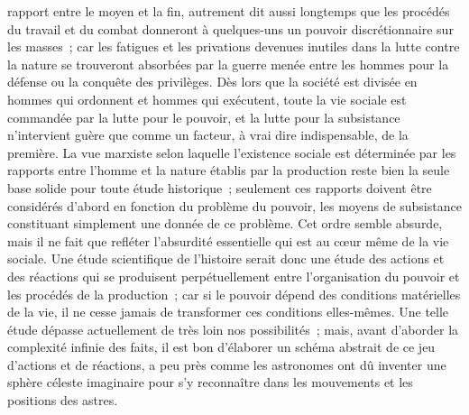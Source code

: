 \documentclass[french,twoside]{book} %
\begin{document}
rapport entre le moyen et la fin, autrement dit aussi longtemps que les procédés du travail et du combat donneront à quelques-uns un pouvoir discrétionnaire sur les masses ; car les fatigues et les privations devenues inutiles dans la lutte contre la nature se trouveront absorbées par la guerre menée entre les hommes pour la défense ou la conquête des privilèges. Dès lors que la société est divisée en hommes qui ordonnent et hommes qui exécutent, toute la vie sociale est commandée par la lutte pour le pouvoir, et la lutte pour la subsistance n'intervient guère que comme un facteur, à vrai dire indispensable, de la première. La vue marxiste selon laquelle l'existence sociale est déterminée par les rapports entre l'homme et la nature établis par la production reste bien la seule base solide pour toute étude historique ; seulement ces rapports doivent être considérés d'abord en fonction du problème du pouvoir, les moyens de subsistance constituant simplement une donnée de ce problème. Cet ordre semble absurde, mais il ne fait que refléter l'absurdité essentielle qui est au cœur même de la vie sociale. Une étude scientifique de l'histoire serait donc une étude des actions et des réactions qui se produisent perpétuellement entre l'organisation du pouvoir et les procédés de la production ; car si le pouvoir dépend des conditions matérielles de la vie, il ne cesse jamais de transformer ces conditions elles-mêmes. Une telle étude dépasse actuellement de très loin nos possibilités ; mais, avant d'aborder la complexité infinie des faits, il est bon d'élaborer un schéma abstrait de ce jeu d'actions et de réactions, a peu près comme les astronomes ont dû inventer une sphère céleste imaginaire pour s'y reconnaître dans les mouvements et les positions des astres.\par
\end{document}
